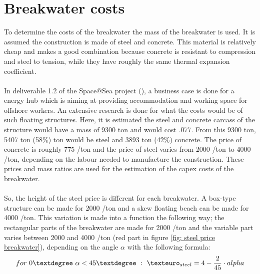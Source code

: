 



\section{Breakwater costs}
\label{sec: breakwater costs}
To determine the costs of the breakwater the mass of the breakwater is used. It is assumed the construction is made of steel and concrete. This material is relatively cheap and makes a good combination because concrete is resistant to compression and steel to tension, while they have roughly the same thermal expansion coefficient.\\
\\
In deliverable 1.2 of the Space@Sea project (\cite{Adam2017D1.2S@S}), a business case is done for a energy hub which is aiming at providing accommodation and working space for offshore workers. An extensive research is done for what the costs would be of such floating structures. Here, it is estimated the steel and concrete carcass of the structure would have a mass of 9300 ton and would cost .077. From this 9300 ton, 5407 ton (58\%) ton would be steel and 3893 ton (42\%) concrete. The price of concrete is roughly  775 \texteuro/ton and the price of steel varies from 2000 \texteuro/ton to 4000 \texteuro/ton, depending on the labour needed to manufacture the construction. These prices and mass ratios are used for the estimation of the \acrshort{capex} costs of the breakwater.\\
\\
So, the height of the steel price is different for each breakwater. A box-type structure can be made for 2000 \texteuro/ton and a skew floating beach can be made for 4000 \texteuro/ton. This variation is made into a function the following way; the rectangular parts of the breakwater are made for 2000 \texteuro/ton and the variable part varies between 2000 and 4000 \texteuro/ton (red part in figure \ref{fig: steel price breakwater}), depending on the angle $\alpha$ with the following formula:
\begin{equation}
    for ~ 0\textdegree ~\alpha<45 \textdegree~:~ \texteuro_{steel} = 4 - \frac{2}{45} \cdot alpha
\end{equation}
